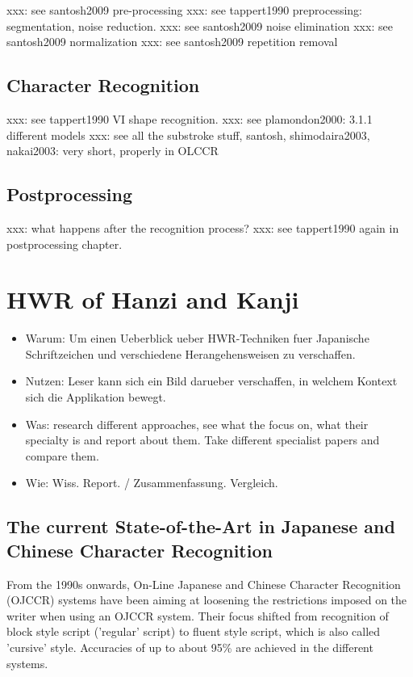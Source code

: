xxx: see santosh2009 pre-processing
xxx: see tappert1990 preprocessing: segmentation, noise reduction.
xxx: see santosh2009 noise elimination
xxx: see santosh2009 normalization
xxx: see santosh2009 repetition removal

\subsection{Character Recognition}
\label{sec:characterrecognition}

xxx: see tappert1990 VI shape recognition.
xxx: see plamondon2000: 3.1.1 different models
xxx: see all the substroke stuff, santosh, shimodaira2003, nakai2003: very short, properly in OLCCR

\subsection{Postprocessing}
\label{sec:postprocessing}

xxx: what happens after the recognition process?
xxx: see tappert1990 again in postprocessing chapter.

\section{HWR of Hanzi and Kanji}
\begin{itemize}
\item Warum: Um einen Ueberblick ueber HWR-Techniken fuer Japanische 
  Schriftzeichen und verschiedene Herangehensweisen zu verschaffen.
\item Nutzen: Leser kann sich ein Bild darueber verschaffen,
  in welchem Kontext sich die Applikation bewegt.
\item Was: research different approaches, see what the focus on, 
  what their specialty is and report about them. Take different specialist 
  papers and compare them.
\item Wie: Wiss. Report. / Zusammenfassung. Vergleich. 
\end{itemize}

\subsection{The current State-of-the-Art in Japanese and Chinese Character Recognition}
From the 1990s onwards, On-Line Japanese and Chinese Character Recognition 
(OJCCR) systems have been aiming at loosening the restrictions imposed on 
the writer when using an OJCCR system. Their focus shifted from recognition 
of block style script ('regular' script) to fluent style script, 
which is also called 'cursive' style. Accuracies of up to about 95\% are
achieved in the different systems.

